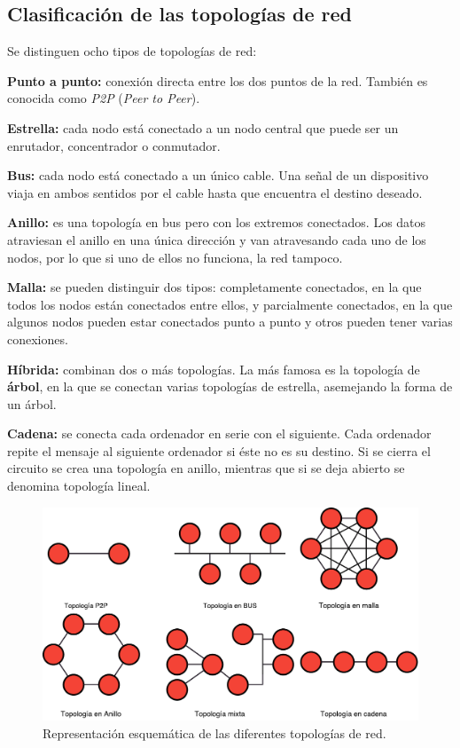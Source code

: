 \documentclass[a4paper, 11pt]{report} %
\begin{document}
\subsection{Clasificación de las topologías de red}
Se distinguen ocho tipos de topologías de red: \cite{bicsi-02}
\renewcommand{\labelitemi}{$\bullet$}
\begin{description}
\item \textbf{Punto a punto:} conexión directa entre los dos puntos de la red. También es conocida como \textit{P2P} (\textit{Peer to Peer}).
\item \textbf{Estrella:} cada nodo está conectado a un nodo central que puede ser un enrutador, concentrador o conmutador.
\item \textbf{Bus:} cada nodo está conectado a un único cable. Una señal de un dispositivo viaja en ambos sentidos por el cable hasta que encuentra el destino deseado.
\item \textbf{Anillo:} es una topología en bus pero con los extremos conectados. Los datos atraviesan el anillo en una única dirección y van atravesando cada uno de los nodos, por lo que si uno de ellos no funciona, la red tampoco.
\item \textbf{Malla:} se pueden distinguir dos tipos: completamente conectados, en la que todos los nodos están conectados entre ellos, y parcialmente conectados, en la que algunos nodos pueden estar conectados punto a punto y otros pueden tener varias conexiones.
\item \textbf{Híbrida:} combinan dos o más topologías. La más famosa es la topología de \textbf{árbol}, en la que se conectan varias topologías de estrella, asemejando la forma de un árbol.
\item \textbf{Cadena:} se conecta cada ordenador en serie con el siguiente. Cada ordenador repite el mensaje al siguiente ordenador si éste no es su destino. Si se cierra el circuito se crea una topología en anillo, mientras que si se deja abierto se denomina topología lineal.
\end{description}

\begin{figure}[H]
\centering
\includegraphics[width=\textwidth]{Resources/Top/Topdered.pdf}
\caption{Representación esquemática de las diferentes topologías de red.}
\end{figure}
\end{document}
